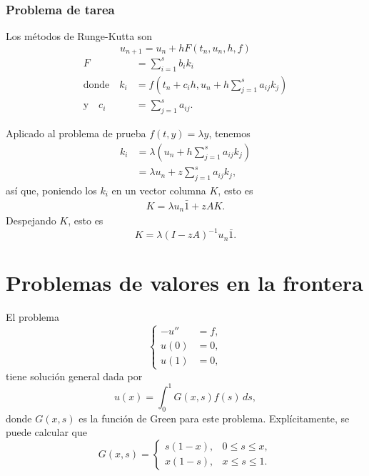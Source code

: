 \documentclass[11pt,letterpaper]{report}
\begin{document}
\subsection{Problema de tarea}

Los métodos de Runge-Kutta son
\begin{equation}
  u_{n+1} = u_n + h F(t_n,u_n,h,f)
\end{equation}
\begin{align}
  F
    &=
    \sum_{i=1}^{s}b_ik_i
  \\[-3mm]
  \text{donde} \quad
  k_i
    &= f(t_n+c_ih, u_n+h \sum_{j=1}^{s}a_{ij} k_j)
    \\[-4mm]
  \text{y} \quad
  c_i
    &= \sum_{j=1}^{s}a_{ij}
.\end{align}

Aplicado al problema de prueba $f(t,y)=\lambda y$, tenemos
\begin{align}
  k_i
  &= \lambda(u_n+h \sum_{j=1}^{s}a_{ij} k_j) \\
  &= \lambda u_n+z \sum_{j=1}^{s}a_{ij} k_j
,\end{align}
así que, poniendo los $k_i$ en un vector columna $K$, esto es
\begin{align}
  K = \lambda u_n\bar 1+zAK
.\end{align}
Despejando $K$, esto es
\begin{equation}
  K=\lambda (I-zA)^{-1}u_n\bar 1
.\end{equation}

\chapter{Problemas de valores en la frontera}

El problema
\begin{equation}
  \left\{
    \begin{aligned}
      -u'' &= f, \\
      u(0) &= 0, \\
      u(1) &= 0,
    \end{aligned}
  \right.
\end{equation}
tiene solución general dada por
\begin{equation}
  u(x) = \int_{0}^{1}G(x,s)f(s)\,ds,
\end{equation}
donde $G(x,s)$ es la función de Green para este problema.
Explícitamente, se puede calcular que
\begin{equation}
  G(x,s)
  =
  \begin{cases}
    s(1-x), & 0\leq s\leq x, \\
    x(1-s), & x\leq s\leq 1.
  \end{cases}
\end{equation}
\end{document}

